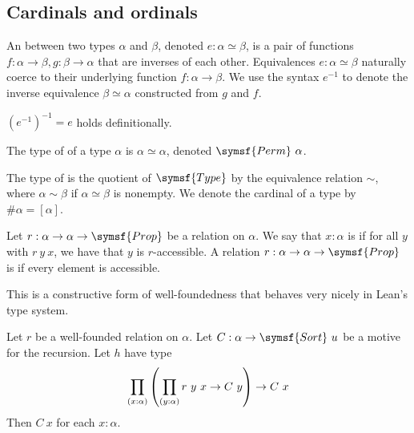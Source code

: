 \subsection{Cardinals and ordinals}

\begin{definition}
    An  between two types \( \alpha \) and \( \beta \), denoted \( e : \alpha \simeq \beta \), is a pair of functions \( f \colon \alpha \to \beta, g \colon \beta \to \alpha \) that are inverses of each other.
    Equivalences \( e : \alpha \simeq \beta \) naturally coerce to their underlying function \( f : \alpha \to \beta \).
    We use the syntax \( e^{-1} \) to denote the inverse equivalence \( \beta \simeq \alpha \) constructed from \( g \) and \( f \).
\end{definition}
\begin{remark}
    \( (e^{-1})^{-1} = e \) holds definitionally.
\end{remark}
\begin{definition}
    The type of  of a type \( \alpha \) is \( \alpha \simeq \alpha \), denoted \( \symsf{Perm}\ \alpha \).
\end{definition}
\begin{definition}
    The type of  is the quotient of \( \symsf{Type} \) by the equivalence relation \( \sim \), where \( \alpha \sim \beta \) if \( \alpha \simeq \beta \) is nonempty.
    We denote the cardinal of a type by \( \#\alpha = [\alpha] \).
\end{definition}
\begin{definition}
    Let \( r : \alpha \to \alpha \to \symsf{Prop} \) be a relation on \( \alpha \).
    We say that \( x : \alpha \) is  if for all \( y \) with \( r\ y\ x \), we have that \( y \) is \( r \)-accessible.
    A relation \( r : \alpha \to \alpha \to \symsf{Prop} \) is  if every element is accessible.
\end{definition}
\begin{remark}
    This is a constructive form of well-foundedness that behaves very nicely in Lean's type system.
\end{remark}
\begin{theorem}
    Let \( r \) be a well-founded relation on \( \alpha \).
    Let \( C : \alpha \to \symsf{Sort}\ u \) be a motive for the recursion.
    Let \( h \) have type
    \[ \prod_{(x : \alpha)} \qty(\prod_{(y : \alpha)} r\ y\ x \to C\ y) \to C\ x \]
    Then  \( C\ x \) for each \( x : \alpha \).
\end{theorem}
